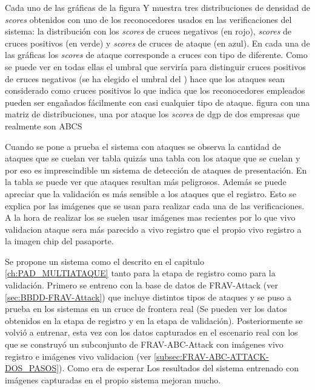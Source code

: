 Cada uno de las gráficas de la figura Y muestra tres distribuciones de densidad de \textit{scores} obtenidos con uno de los reconocedores  usados en las verificaciones del sistema: la distribución con los \textit{scores} de cruces negativos (en rojo), \textit{scores} de cruces positivos (en verde) y \textit{scores} de cruces de ataque (en azul). En cada una de las gráficas los \textit{scores} de ataque corresponde a cruces con tipo de  diferente. Como se puede ver en todas ellas el umbral que serviría para distinguir cruces positivos de cruces negativos (se ha elegido el umbral del ) hace que los ataques sean considerado como cruces positivos lo que indica que los reconocedores empleados pueden ser engañados fácilmente con casi cualquier tipo de ataque.
\color{red}figura con una matriz de distribuciones, una por ataque los \textit{scores} de dgp de dos empresas que realmente son ABCS\color{black}

Cuando se pone a prueba el sistema con ataques se observa la cantidad de ataques que se cuelan ver tabla \color{red}quizás una tabla con los ataque que se cuelan\color{black} y por eso es imprescindible un sistema de detección de ataques de presentación. En la tabla se puede ver que ataques resultan más peligrosos. Además se puede apreciar que la validación es más sensible a los ataques que el registro. Esto se explica por las imágenes que se usan para realizar cada una de las verificaciones. A la hora de realizar los  se suelen usar imágenes mas recientes por lo que \gls{vivo validacion ataque} sera más parecido a \gls{vivo registro} que el propio \gls{vivo registro} a la imagen \gls{chip} del pasaporte.

Se propone un sistema  como el descrito en el capitulo \ref{ch:PAD_MULTIATAQUE} tanto para la etapa de registro como para la validación. Primero se entreno con la base de datos de \Gls{FRAV-Attack} (ver \ref{sec:BBDD-FRAV-Attack})  que incluye distintos tipos de ataques y se puso a prueba en los sistemas  en un cruce de frontera real (Se pueden ver los datos obtenidos en la etapa de registro y en la etapa de validación).
Posteriormente se volvió a entrenar, esta vez con los datos capturados en el escenario real con los que se construyó un subconjunto de \Gls{FRAV-ABC-Attack} con imágenes \gls{vivo registro} e imágenes \gls{vivo validacion} (ver \ref{subsec:FRAV-ABC-ATTACK-DOS_PASOS}). Como era de esperar Los resultados del sistema entrenado con imágenes capturadas en el propio sistema mejoran mucho.


